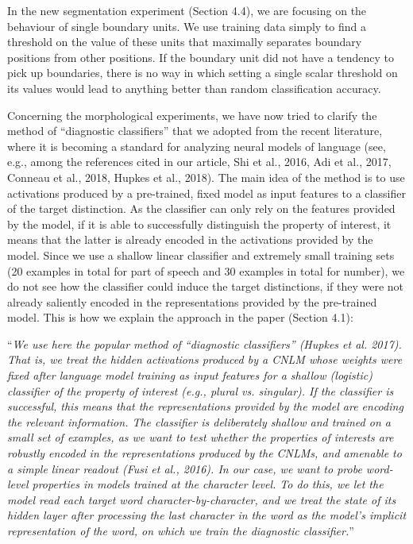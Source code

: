 \documentclass{article}
\begin{document}
In the new segmentation experiment (Section 4.4), we are focusing on the behaviour of single boundary units. We use training data simply to find a threshold on the value of these units that maximally separates boundary positions from other positions. If the boundary unit did not have a tendency to pick up boundaries, there is no way in which setting a single scalar threshold on its values would lead to anything better than random classification accuracy.

Concerning the morphological experiments, we have now tried to clarify the method of ``diagnostic classifiers'' that we adopted from the recent literature, where it is becoming a standard for analyzing neural models of language (see, e.g., among the references cited in our article, Shi et al., 2016, Adi et al., 2017, Conneau et al., 2018, Hupkes et al., 2018). The main idea of the method is to use activations produced by a pre-trained, fixed model as input features to a classifier of the target distinction. As the classifier can only rely on the features provided by the model, if it is able to successfully distinguish the property of interest, it means that the latter is already encoded in the activations provided by the model. Since we use a shallow linear classifier and extremely small training sets (20 examples in total for part of speech and 30 examples in total for number), we do not see how the classifier could induce the target distinctions, if they were not already saliently encoded in the representations provided by the pre-trained model. This is how we explain the approach in the paper (Section 4.1):

``\textit{We use here the popular method of ``diagnostic classifiers'' (Hupkes et al. 2017). That is, we treat the hidden activations produced by a CNLM whose weights were fixed after language model training as input features for a shallow (logistic) classifier of the property of interest (e.g., plural vs. singular). If the classifier is successful, this means that the representations provided by the model are encoding the relevant information.  The classifier is deliberately shallow and trained on a small set of examples, as we want to test whether the properties of interests are robustly encoded in the representations produced by the CNLMs, and amenable to a simple linear readout (Fusi et al., 2016). In our case, we want to probe word-level properties in models trained at the character level. To do this, we let the model read each target word character-by-character, and we treat the state of its hidden layer after processing the last character in the word as the model's implicit representation of the word, on which we train the diagnostic classifier.}''
\newline
\end{document}
